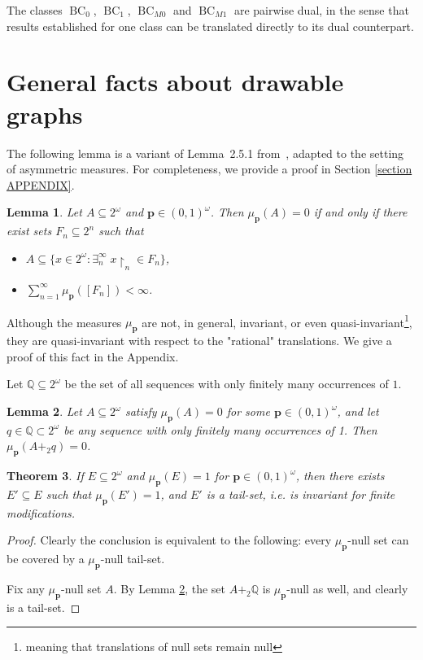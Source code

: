\documentclass{amsart}
\newtheorem{theorem}{Theorem}[section]
\newtheorem{lemma}[theorem]{Lemma}
\theoremstyle{plain}
\theoremstyle{definition}
\theoremstyle{remark}
\numberwithin{equation}{section}
\newcommand{\black}{\color{black}}
\newcommand{\on}{\operatorname}
\newcommand{\s}{\subseteq}
\begin{document}
The classes $\on{BC}_0$, $\on{BC}_1$, $\on{BC}_{M0}$ and $\on{BC}_{M1}$ are pairwise dual, in the sense that results established for one class can be translated directly to its dual counterpart.

\black

\section{General facts about drawable graphs}\label{section General facts about drawable graphs}
The following lemma is a variant of Lemma~2.5.1 from~\cite{BartoszynskiJudah1995}, adapted to the setting of asymmetric measures.  
For completeness, we provide a proof in Section \ref{section APPENDIX}.

    \begin{lemma}\label{bartoszynskilemma}
    Let $A\s 2^\omega$ and $\mathbf{p}\in (0,1)^\omega$. %
    Then $\mu_{\mathbf{p}}(A)=0$ if and only if there exist sets $F_n \s 2^n$ such that
    \begin{itemize}
        \item $A\s \{x \in 2^\omega : \exists_n^\infty \; x \restriction_n \in F_n\}$,
        \item $\sum\limits_{n=1}^{\infty}\mu_{\mathbf{p}}([F_n])<\infty$.
    \end{itemize}
\end{lemma}


Although the measures $\mu_{\mathbf{p}}$ are not, in general, invariant, or even quasi-invariant\footnote{meaning that translations of null sets remain null}, they are quasi-invariant with respect to the "rational" translations. We give a proof of this fact in the Appendix.

Let $\mathbb Q \s 2^\omega$ be the set of all sequences with only finitely many occurrences of $1$.
\begin{lemma}\label{rationals}
    Let  $A\s 2^\omega$ satisfy $\mu_{\mathbf{p}}(A)=0$ for some $\mathbf{p} \in (0,1)^\omega$, and let $q \in \mathbb{Q}\subset 2^\omega$ be any sequence with only finitely many occurrences of 1. Then $\mu_{\mathbf{p}}(A +_2 q)=0$.
\end{lemma}


\begin{theorem}\label{tail-sets}
    If $E \s 2^\omega$ and $\mu_{\mathbf{p}}(E)=1$ for $\mathbf{p} \in (0,1)^\omega$, then there exists $E'\s E$ such that $\mu_{\mathbf{p}}(E')=1$, and $E'$ is a tail-set, i.e. is invariant for finite modifications.
\end{theorem}
\begin{proof}
    Clearly the conclusion is equivalent to the following: every $\mu_{\textbf{p}}$-null set can be covered by a $\mu_{\textbf{p}}$-null tail-set. 
    
    Fix any $\mu_{\textbf{p}}$-null set $A$. By Lemma \ref{rationals}, the set $A+_2\mathbb Q$ is $\mu_{\textbf{p}}$-null as well, and clearly is a tail-set.
\end{proof}
\end{document}
